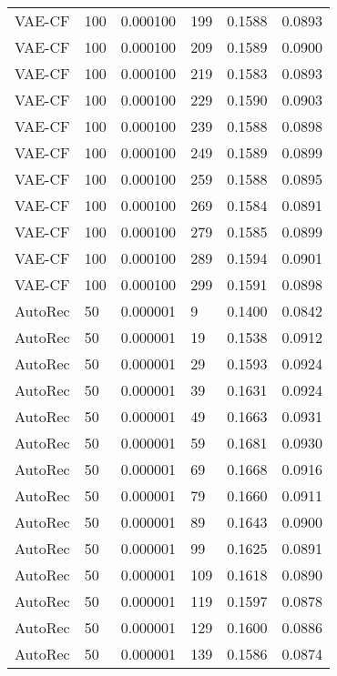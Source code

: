 \begin{tabular}{llrlrr}
  VAE-CF &  100 &  0.000100 &   199 &  0.1588 &       0.0893 \\
  VAE-CF &  100 &  0.000100 &   209 &  0.1589 &       0.0900 \\
  VAE-CF &  100 &  0.000100 &   219 &  0.1583 &       0.0893 \\
  VAE-CF &  100 &  0.000100 &   229 &  0.1590 &       0.0903 \\
  VAE-CF &  100 &  0.000100 &   239 &  0.1588 &       0.0898 \\
  VAE-CF &  100 &  0.000100 &   249 &  0.1589 &       0.0899 \\
  VAE-CF &  100 &  0.000100 &   259 &  0.1588 &       0.0895 \\
  VAE-CF &  100 &  0.000100 &   269 &  0.1584 &       0.0891 \\
  VAE-CF &  100 &  0.000100 &   279 &  0.1585 &       0.0899 \\
  VAE-CF &  100 &  0.000100 &   289 &  0.1594 &       0.0901 \\
  VAE-CF &  100 &  0.000100 &   299 &  0.1591 &       0.0898 \\
 AutoRec &   50 &  0.000001 &     9 &  0.1400 &       0.0842 \\
 AutoRec &   50 &  0.000001 &    19 &  0.1538 &       0.0912 \\
 AutoRec &   50 &  0.000001 &    29 &  0.1593 &       0.0924 \\
 AutoRec &   50 &  0.000001 &    39 &  0.1631 &       0.0924 \\
 AutoRec &   50 &  0.000001 &    49 &  0.1663 &       0.0931 \\
 AutoRec &   50 &  0.000001 &    59 &  0.1681 &       0.0930 \\
 AutoRec &   50 &  0.000001 &    69 &  0.1668 &       0.0916 \\
 AutoRec &   50 &  0.000001 &    79 &  0.1660 &       0.0911 \\
 AutoRec &   50 &  0.000001 &    89 &  0.1643 &       0.0900 \\
 AutoRec &   50 &  0.000001 &    99 &  0.1625 &       0.0891 \\
 AutoRec &   50 &  0.000001 &   109 &  0.1618 &       0.0890 \\
 AutoRec &   50 &  0.000001 &   119 &  0.1597 &       0.0878 \\
 AutoRec &   50 &  0.000001 &   129 &  0.1600 &       0.0886 \\
 AutoRec &   50 &  0.000001 &   139 &  0.1586 &       0.0874 \\

\end{tabular}
